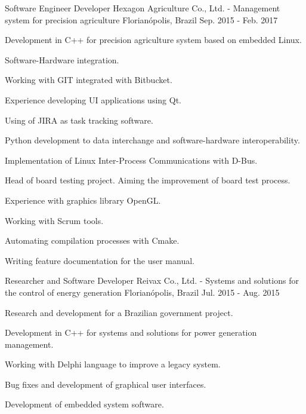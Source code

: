 \begin{cventries}
  \cventry
    {Software Engineer Developer} %
    {Hexagon Agriculture Co., Ltd. - Management system for precision agriculture} %
    {Florianópolis, Brazil} %
    {Sep. 2015 - Feb. 2017} %
    {
      \begin{cvitems} %
        \item {Development in C++ for precision agriculture system based on embedded Linux.}
        \item {Software-Hardware integration.}
        \item {Working with GIT integrated with Bitbucket.}
        \item {Experience developing UI applications using Qt.}
        \item {Using of JIRA as task tracking software.}
        \item {Python development to data interchange and software-hardware interoperability.}
        \item {Implementation of Linux Inter-Process Communications with D-Bus.}
        \item {Head of board testing project. Aiming the improvement of board test process.}
        \item {Experience with graphics library OpenGL.}
        \item {Working with Scrum tools.}
        \item {Automating compilation processes with Cmake.}
        \item {Writing feature documentation for the user manual.}
      \end{cvitems}
    }

  \cventry
    {Researcher and Software Developer} %
    {Reivax Co., Ltd. - Systems and solutions for the control of energy generation} %
    {Florianópolis, Brazil} %
    {Jul. 2015 - Aug. 2015} %
    {
      \begin{cvitems} %
        \item {Research and development for a Brazilian government project.}
        \item {Development in C++ for systems and solutions for power generation management.}
        \item {Working with Delphi language to improve a legacy system.}
        \item {Bug fixes and development of graphical user interfaces.}
        \item {Development of embedded system software.}
      \end{cvitems}
    }


\end{cventries}
